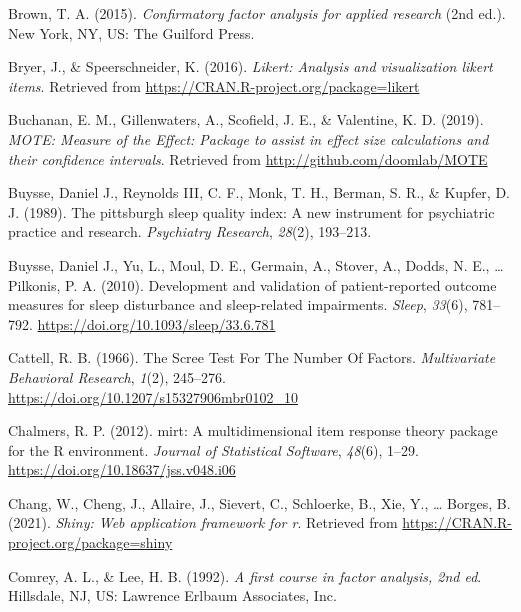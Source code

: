 \documentclass[
  english,
  man]{apa6}
\newlength{\cslhangindent}
\newlength{\cslentryspacingunit} %
\newenvironment{CSLReferences}[2] %
 {%
  \setlength{\parindent}{0pt}
  \ifodd #1
  \let\oldpar\par
  \def\par{\hangindent=\cslhangindent\oldpar}
  \fi
  \setlength{\parskip}{#2\cslentryspacingunit}
 }%
 {}
\begin{document}
\begin{CSLReferences}{1}{0}
\leavevmode{}%
Brown, T. A. (2015). \emph{Confirmatory factor analysis for applied research} (2nd ed.). {New York, NY, US}: {The Guilford Press}.

\leavevmode{}%
Bryer, J., \& Speerschneider, K. (2016). \emph{Likert: Analysis and visualization likert items}. Retrieved from \url{https://CRAN.R-project.org/package=likert}

\leavevmode{}%
Buchanan, E. M., Gillenwaters, A., Scofield, J. E., \& Valentine, K. D. (2019). \emph{{MOTE: Measure of the Effect}: Package to assist in effect size calculations and their confidence intervals}. Retrieved from \url{http://github.com/doomlab/MOTE}

\leavevmode{}%
Buysse, Daniel J., Reynolds III, C. F., Monk, T. H., Berman, S. R., \& Kupfer, D. J. (1989). The pittsburgh sleep quality index: A new instrument for psychiatric practice and research. \emph{Psychiatry Research}, \emph{28}(2), 193--213.

\leavevmode{}%
Buysse, Daniel J., Yu, L., Moul, D. E., Germain, A., Stover, A., Dodds, N. E., \ldots{} Pilkonis, P. A. (2010). Development and validation of patient-reported outcome measures for sleep disturbance and sleep-related impairments. \emph{Sleep}, \emph{33}(6), 781--792. \url{https://doi.org/10.1093/sleep/33.6.781}

\leavevmode{}%
Cattell, R. B. (1966). The {Scree Test For The Number Of Factors}. \emph{Multivariate Behavioral Research}, \emph{1}(2), 245--276. \url{https://doi.org/10.1207/s15327906mbr0102_10}

\leavevmode{}%
Chalmers, R. P. (2012). {mirt}: A multidimensional item response theory package for the {R} environment. \emph{Journal of Statistical Software}, \emph{48}(6), 1--29. \url{https://doi.org/10.18637/jss.v048.i06}

\leavevmode{}%
Chang, W., Cheng, J., Allaire, J., Sievert, C., Schloerke, B., Xie, Y., \ldots{} Borges, B. (2021). \emph{Shiny: Web application framework for r}. Retrieved from \url{https://CRAN.R-project.org/package=shiny}

\leavevmode{}%
Comrey, A. L., \& Lee, H. B. (1992). \emph{A first course in factor analysis, 2nd ed}. {Hillsdale, NJ, US}: {Lawrence Erlbaum Associates, Inc}.


\end{CSLReferences}
\end{document}
